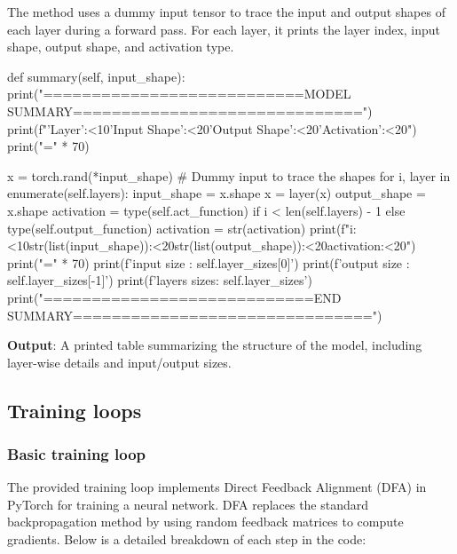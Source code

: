 \documentclass[english]{article}
\begin{document}
The method uses a dummy input tensor to trace the input and output shapes of each layer during a forward pass. For each layer, it prints the layer index, input shape, output shape, and activation type.

\begin{python}
def summary(self, input_shape):
    print("===========================MODEL SUMMARY==============================")
    print(f"{'Layer':<10}{'Input Shape':<20}{'Output Shape':<20}{'Activation':<20}")
    print("=" * 70)

    x = torch.rand(*input_shape)  # Dummy input to trace the shapes
    for i, layer in enumerate(self.layers):
        input_shape = x.shape
        x = layer(x)
        output_shape = x.shape
        activation = type(self.act_function) if i < len(self.layers) - 1 else type(self.output_function)
        activation = str(activation)
        print(f"{i:<10}{str(list(input_shape)):<20}{str(list(output_shape)):<20}{activation:<20}")
    print("=" * 70)
    print(f'input size  : {self.layer_sizes[0]}')
    print(f'output size : {self.layer_sizes[-1]}')
    print(f'layers sizes: {self.layer_sizes}')
    print("============================END SUMMARY===============================")
\end{python}

\textbf{Output}: A printed table summarizing the structure of the model, including layer-wise details and input/output sizes.












\subsection{Training loops}

\subsubsection{Basic training loop}

The provided training loop implements Direct Feedback Alignment (DFA) in PyTorch for training a neural network. DFA replaces the standard backpropagation method by using random feedback matrices to compute gradients. Below is a detailed breakdown of each step in the code:
\end{document}
